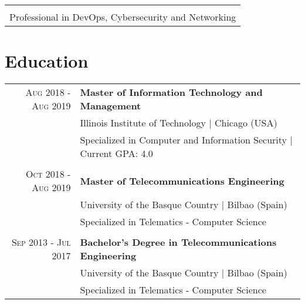 \documentclass[a4paper,10pt]{article}
\begin{document}
\vspace{-.00in}

\begin{center}
\begin{tabular}{c}
  \hline \\[-0.8em]
  Professional in DevOps, Cybersecurity and Networking
\end{tabular}
\end{center}


\renewcommand{\arraystretch}{0.6}%
\section{Education}
\begin{tabular}{rp{13.6cm}}

 \textsc{Aug 2018 - Aug 2019}& \textbf{Master of Information Technology and Management}\\
 & \footnotesize{Illinois Institute of Technology | Chicago (USA)} \\
 & Specialized in Computer and Information Security | Current GPA: 4.0 \\ &\\

 \textsc{Oct 2018 - Aug 2019}& \textbf{Master of Telecommunications Engineering}\\
 & \footnotesize{University of the Basque Country | Bilbao (Spain)} \\
 & Specialized in Telematics - Computer Science \\&\\
 
 \textsc{Sep 2013 - Jul 2017}& \textbf{Bachelor's Degree in Telecommunications Engineering}\\
 & \footnotesize{University of the Basque Country | Bilbao (Spain)} \\
 & Specialized in Telematics - Computer Science 

\end{tabular}
\end{document}
